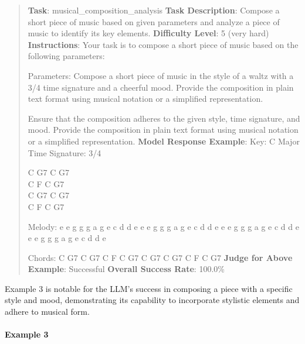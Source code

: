 \documentclass[fleqn,10pt]{wlscirep}
\begin{document}
\begin{quote}
\textbf{Task}: musical\_composition\_analysis \textbf{Task Description}:
Compose a short piece of music based on given parameters and analyze a
piece of music to identify its key elements. \textbf{Difficulty Level}:
5 (very hard) \textbf{Instructions}: Your task is to compose a short
piece of music based on the following parameters:

Parameters: Compose a short piece of music in the style of a waltz with
a 3/4 time signature and a cheerful mood. Provide the composition in
plain text format using musical notation or a simplified representation.

Ensure that the composition adheres to the given style, time signature,
and mood. Provide the composition in plain text format using musical
notation or a simplified representation. \textbf{Model Response
Example}: Key: C Major Time Signature: 3/4

C \textbar{} G7 \textbar{} C \textbar{} G7 \textbar{}\\
C \textbar{} F \textbar{} C \textbar{} G7 \textbar{}\\
C \textbar{} G7 \textbar{} C \textbar{} G7 \textbar{}\\
C \textbar{} F \textbar{} C \textbar{} G7 \textbar{}

Melody: e e g \textbar{} g g a \textbar{} g e c \textbar{} d d e
\textbar{} e e g \textbar{} g g a \textbar{} g e c \textbar{} d d e
\textbar{} e e g \textbar{} g g a \textbar{} g e c \textbar{} d d e
\textbar{} e e g \textbar{} g g a \textbar{} g e c \textbar{} d d e
\textbar{}

Chords: C G7 C G7 C F C G7 C G7 C G7 C F C G7 \textbf{Judge for Above
Example}: Successful \textbf{Overall Success Rate}: 100.0\%
\end{quote}

Example 3 is notable for the LLM's success in composing a piece with a
specific style and mood, demonstrating its capability to incorporate
stylistic elements and adhere to musical form.

\hypertarget{example-3-5}{%
\paragraph{Example 3}\label{example-3-5}}
\end{document}
